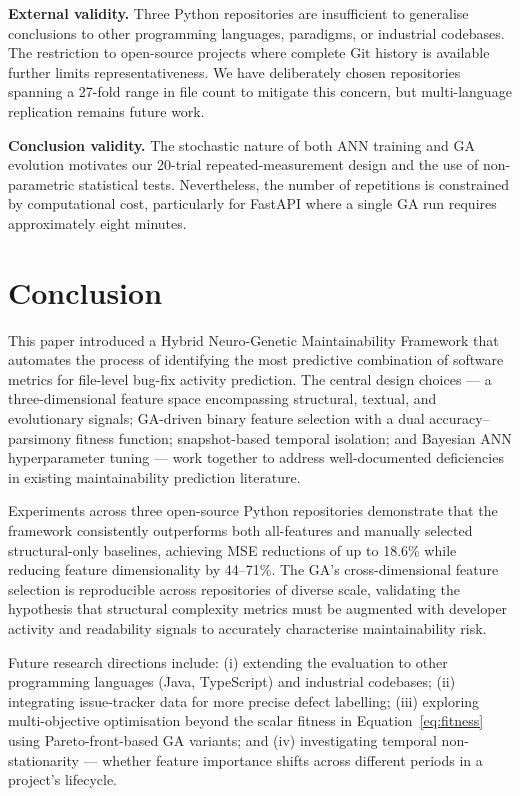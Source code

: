\documentclass[11pt,a4paper]{article}
\begin{document}
\textbf{External validity.} Three Python repositories are insufficient to
generalise conclusions to other programming languages, paradigms, or industrial
codebases. The restriction to open-source projects where complete Git history
is available further limits representativeness. We have deliberately chosen
repositories spanning a 27-fold range in file count to mitigate this concern,
but multi-language replication remains future work.

\textbf{Conclusion validity.} The stochastic nature of both ANN training and
GA evolution motivates our 20-trial repeated-measurement design and the use of
non-parametric statistical tests. Nevertheless, the number of repetitions is
constrained by computational cost, particularly for FastAPI where a single GA
run requires approximately eight minutes.

\section{Conclusion}
\label{sec:conclusion}

This paper introduced a Hybrid Neuro-Genetic Maintainability Framework that
automates the process of identifying the most predictive combination of software
metrics for file-level bug-fix activity prediction. The central design choices
--- a three-dimensional feature space encompassing structural, textual, and
evolutionary signals; GA-driven binary feature selection with a dual
accuracy--parsimony fitness function; snapshot-based temporal isolation; and
Bayesian ANN hyperparameter tuning --- work together to address well-documented
deficiencies in existing maintainability prediction literature.

Experiments across three open-source Python repositories demonstrate that the
framework consistently outperforms both all-features and manually selected
structural-only baselines, achieving MSE reductions of up to 18.6\% while
reducing feature dimensionality by 44--71\%. The GA's cross-dimensional feature
selection is reproducible across repositories of diverse scale, validating the
hypothesis that structural complexity metrics must be augmented with developer
activity and readability signals to accurately characterise maintainability risk.

Future research directions include: (i) extending the evaluation to other
programming languages (Java, TypeScript) and industrial codebases; (ii)
integrating issue-tracker data for more precise defect labelling; (iii)
exploring multi-objective optimisation beyond the scalar fitness in
Equation~\eqref{eq:fitness} using Pareto-front-based GA variants; and
(iv) investigating temporal non-stationarity --- whether feature importance
shifts across different periods in a project's lifecycle.
\end{document}
